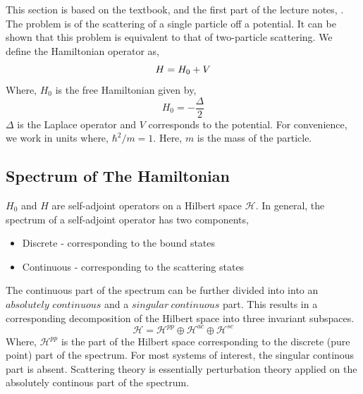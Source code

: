 \documentclass[a4paper,10pt]{report}
\begin{document}
This section is based on the textbook, \cite{TaylorScattering}
and the first part of the lecture notes, \cite{YafaevScattering}. The problem is of the scattering of a single particle off
a potential. It can be shown that this problem is equivalent to that of two-particle
scattering.
We define the Hamiltonian operator as,
\begin{equation}
 H = H_0+V\\
\end{equation}
 Where, $H_0$ is the free Hamiltonian given by, 
\begin{equation}
 H_0=-\frac{\Delta}{2}
\end{equation}
 $\Delta$ is the Laplace operator and $V$ corresponds to the potential. 
For convenience, we work in units where, $\hbar^2/m=1$. Here, $m$ is the
mass of the particle.

\subsection{Spectrum of The Hamiltonian}
 $H_0$ and $H$ are self-adjoint operators on a Hilbert space
$\mathcal{H}$. In general, the spectrum of a self-adjoint operator has
two components,
\begin{itemize}
 \item Discrete - corresponding to the bound states
 \item Continuous - corresponding to the scattering states
\end{itemize}
The continuous part of the spectrum can be further divided into into
an $absolutely$ $continuous$ and a $singular\ continuous$ part. This results in a
corresponding decomposition of the Hilbert space into three invariant subspaces.
\begin{equation}\label{HilbertDecomp}
 \mathcal{H}=\mathcal{H}^{pp}\oplus\mathcal{H}^{ac}\oplus\mathcal{H}^{sc}
\end{equation}
 Where, $\mathcal{H}^{pp}$ is the part of the Hilbert space corresponding to
the discrete (pure point) part of the spectrum. For most systems of interest, the singular continous 
part is absent. Scattering theory is essentially perturbation theory applied on the 
absolutely continous part of the spectrum.
\end{document}
